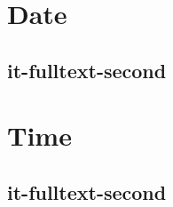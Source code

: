 \documentclass[italian]{article}
\begin{document}
\section{Date}
\subsection{it-fulltext-second}

\section{Time}
\subsection{it-fulltext-second}

\end{document}
